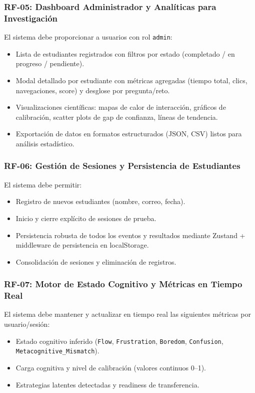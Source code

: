\documentclass[11pt,a4paper]{article}
\begin{document}
\subsubsection{RF-05: Dashboard Administrador y Analíticas para Investigación}

El sistema debe proporcionar a usuarios con rol \texttt{admin}:

\begin{itemize}
    \item Lista de estudiantes registrados con filtros por estado (completado / en progreso / pendiente).
    \item Modal detallado por estudiante con métricas agregadas (tiempo total, clics, navegaciones, score) y desglose por pregunta/reto.
    \item Visualizaciones científicas: mapas de calor de interacción, gráficos de calibración, scatter plots de gap de confianza, líneas de tendencia.
    \item Exportación de datos en formatos estructurados (JSON, CSV) listos para análisis estadístico.
\end{itemize}

\subsubsection{RF-06: Gestión de Sesiones y Persistencia de Estudiantes}

El sistema debe permitir:

\begin{itemize}
    \item Registro de nuevos estudiantes (nombre, correo, fecha).
    \item Inicio y cierre explícito de sesiones de prueba.
    \item Persistencia robusta de todos los eventos y resultados mediante Zustand + middleware de persistencia en localStorage.
    \item Consolidación de sesiones y eliminación de registros.
\end{itemize}

\subsubsection{RF-07: Motor de Estado Cognitivo y Métricas en Tiempo Real}

El sistema debe mantener y actualizar en tiempo real las siguientes métricas por usuario/sesión:

\begin{itemize}
    \item Estado cognitivo inferido (\texttt{Flow}, \texttt{Frustration}, \texttt{Boredom}, \texttt{Confusion}, \texttt{Metacognitive\_Mismatch}).
    \item Carga cognitiva y nivel de calibración (valores continuos 0--1).
    \item Estrategias latentes detectadas y readiness de transferencia.
\end{itemize}
\end{document}
